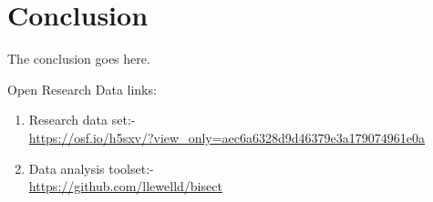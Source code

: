 \documentclass[10pt,journal,compsoc]{IEEEtran}
\begin{document}




\section{Conclusion}
The conclusion goes here.


Open Research Data links:
\begin{enumerate}
\item Research data set:- \\ \url{https://osf.io/h5sxv/?view_only=aec6a6328d9d46379e3a179074961e0a}
\item Data analysis toolset:- \\ \url{https://github.com/llewelld/bisect}
\end{enumerate}



%
\end{document}
